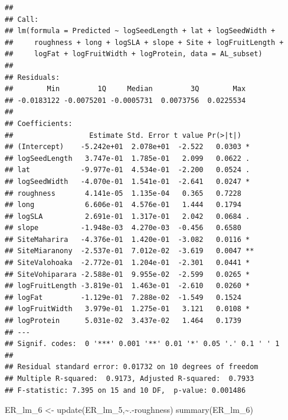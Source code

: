 \documentclass[
  12pt,
]{article}
\newenvironment{Shaded}{\begin{snugshade}}{\end{snugshade}}
\newcommand{\FunctionTok}[1]{\textcolor[rgb]{0.00,0.00,0.00}{#1}}
\newcommand{\NormalTok}[1]{#1}
\newcommand{\OtherTok}[1]{\textcolor[rgb]{0.56,0.35,0.01}{#1}}
\newcommand{\SpecialCharTok}[1]{\textcolor[rgb]{0.00,0.00,0.00}{#1}}
\begin{document}
\begin{verbatim}
## 
## Call:
## lm(formula = Predicted ~ logSeedLength + lat + logSeedWidth + 
##     roughness + long + logSLA + slope + Site + logFruitLength + 
##     logFat + logFruitWidth + logProtein, data = AL_subset)
## 
## Residuals:
##        Min         1Q     Median         3Q        Max 
## -0.0183122 -0.0075201 -0.0005731  0.0073756  0.0225534 
## 
## Coefficients:
##                  Estimate Std. Error t value Pr(>|t|)   
## (Intercept)    -5.242e+01  2.078e+01  -2.522   0.0303 * 
## logSeedLength   3.747e-01  1.785e-01   2.099   0.0622 . 
## lat            -9.977e-01  4.534e-01  -2.200   0.0524 . 
## logSeedWidth   -4.070e-01  1.541e-01  -2.641   0.0247 * 
## roughness       4.141e-05  1.135e-04   0.365   0.7228   
## long            6.606e-01  4.576e-01   1.444   0.1794   
## logSLA          2.691e-01  1.317e-01   2.042   0.0684 . 
## slope          -1.948e-03  4.270e-03  -0.456   0.6580   
## SiteMaharira   -4.376e-01  1.420e-01  -3.082   0.0116 * 
## SiteMiaranony  -2.537e-01  7.012e-02  -3.619   0.0047 **
## SiteValohoaka  -2.772e-01  1.204e-01  -2.301   0.0441 * 
## SiteVohiparara -2.588e-01  9.955e-02  -2.599   0.0265 * 
## logFruitLength -3.819e-01  1.463e-01  -2.610   0.0260 * 
## logFat         -1.129e-01  7.288e-02  -1.549   0.1524   
## logFruitWidth   3.979e-01  1.275e-01   3.121   0.0108 * 
## logProtein      5.031e-02  3.437e-02   1.464   0.1739   
## ---
## Signif. codes:  0 '***' 0.001 '**' 0.01 '*' 0.05 '.' 0.1 ' ' 1
## 
## Residual standard error: 0.01732 on 10 degrees of freedom
## Multiple R-squared:  0.9173, Adjusted R-squared:  0.7933 
## F-statistic: 7.395 on 15 and 10 DF,  p-value: 0.001486
\end{verbatim}

\begin{Shaded}
\begin{Highlighting}[]
\NormalTok{ER\_lm\_6 }\OtherTok{\textless{}{-}} \FunctionTok{update}\NormalTok{(ER\_lm\_5,}\SpecialCharTok{\textasciitilde{}}\NormalTok{.}\SpecialCharTok{{-}}\NormalTok{roughness)}
\FunctionTok{summary}\NormalTok{(ER\_lm\_6)}
\end{Highlighting}
\end{Shaded}
\end{document}
